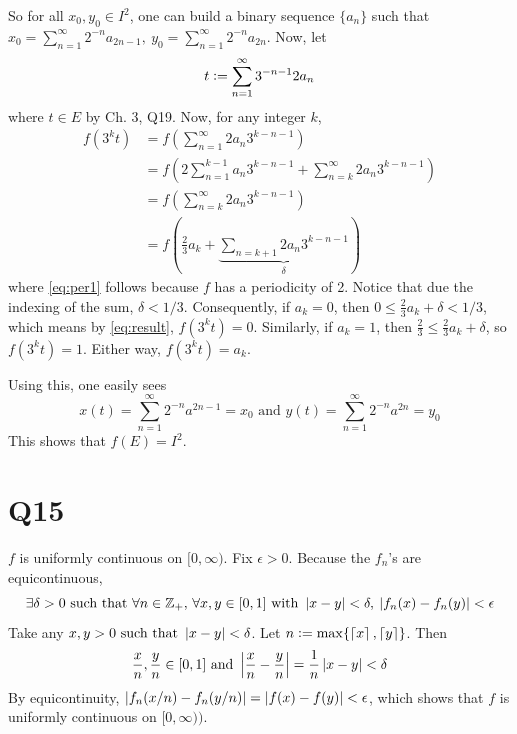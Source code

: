 \documentclass[12pt]{article}
\begin{document}
So for all $x_0, y_0 \in I^2$, one can build a binary sequence $\{a_n\}$ such that $x_0 = \sum_{n = 1}^{\infty} 2^{-n} a_{2n - 1}, \: y_0 = \sum_{n = 1}^{\infty} 2^{-n} a_{2n}$. 
Now, let 
$$t \vcentcolon= \sum_{n = 1}^{\infty} 3^{-n - 1} 2a_n$$
where $t \in E$ by Ch. 3, Q19.
Now, for any integer $k$, 
\begin{align}
  f(3^k t) & = f(\sum_{n = 1}^{\infty} 2 a_n 3^{k - n - 1}) \nonumber \\ 
           & = f(2 \sum_{n = 1}^{k - 1} a_n 3^{k - n - 1} + \sum_{n = k}^{\infty} 2 a_n 3^{k - n - 1}) \nonumber \\ 
           & = f(\sum_{n = k}^{\infty} 2 a_n 3^{k - n - 1}) \label{eq:per1}\\ 
           & = f(\frac{2}{3} a_k + \underbrace{\sum_{n = k + 1} 2 a_n 3^{k - n - 1}}_{\delta}) \label{eq:result}  
\end{align} 
where \eqref{eq:per1} follows because $f$ has a periodicity of 2. 
Notice that due the indexing of the sum, $\delta < 1/3$. 
Consequently, if $a_k = 0$, then $0 \leq \frac{2}{3} a_k + \delta < 1/3$, which means by \eqref{eq:result}, $f(3^k t) = 0$. 
Similarly, if $a_k = 1$, then $\frac{2}{3} \leq \frac{2}{3} a_k + \delta$, so $f(3^k t) = 1$.
Either way, $f(3^k t) = a_k$.

Using this, one easily sees 
$$x(t) = \sum_{n = 1}^{\infty} 2^{-n} a^{2n - 1} = x_0 \text{ and } y(t) = \sum_{n = 1}^{\infty} 2^{-n} a^{2n} = y_0$$ 
This shows that $f(E) = I^2$. 

\section*{Q15}
$f$ is uniformly continuous on $[0, \infty)$. 
Fix $\epsilon > 0$. 
Because the $f_n$'s are equicontinuous, 
$$\exists \delta > 0 \text{ such that } \forall n \in \mathbb{Z}_{+}, \, \forall x, y \in [0, 1] \text{ with } \left|x - y\right| < \delta, \: \left|f_n(x) - f_n(y)\right| < \epsilon$$
Take any $x, y > 0 \text{ such that } \left|x - y\right| < \delta$. 
Let $n \vcentcolon= \max\{\left\lceil x \right\rceil, \left\lceil y \right\rceil\}$. 
Then 
$$\frac{x}{n}, \frac{y}{n} \in [0, 1] \text{ and }\left|\frac{x}{n} - \frac{y}{n}\right| = \frac{1}{n} \left|x - y\right| < \delta$$ 
By equicontinuity, $\left|f_n(x / n) - f_n(y / n)\right| = \left|f(x) - f(y)\right| < \epsilon$, which shows that $f$ is uniformly continuous on $[0, \infty))$.  
\end{document}
